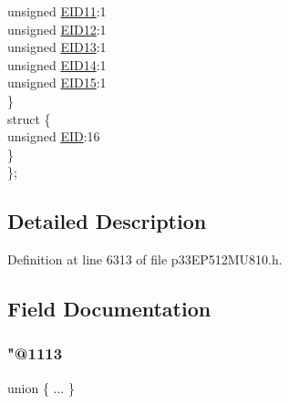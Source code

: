 \begin{DoxyCompactItemize}
\begin{tabbing}
\>\>unsigned \hyperlink{structtag_c2_r_x_f2_e_i_d_b_i_t_s_a710bdb0d602deb021b0be99066008018}{EID11}:1\\
\>\>unsigned \hyperlink{structtag_c2_r_x_f2_e_i_d_b_i_t_s_aa347bb85867bd8d4e0124f7cff8c6472}{EID12}:1\\
\>\>unsigned \hyperlink{structtag_c2_r_x_f2_e_i_d_b_i_t_s_a37d5f3edcbf6ef62f848fd4f3c584f79}{EID13}:1\\
\>\>unsigned \hyperlink{structtag_c2_r_x_f2_e_i_d_b_i_t_s_a7ffc0b0e0d99b8476b6f9a45337c17ab}{EID14}:1\\
\>\>unsigned \hyperlink{structtag_c2_r_x_f2_e_i_d_b_i_t_s_a293cd7dc1746257fa75a60cbd9383cd7}{EID15}:1\\
\>\} \\
\>struct \{\\
\>\>unsigned \hyperlink{structtag_c2_r_x_f2_e_i_d_b_i_t_s_ae80b378c9141f7c03e0b4e55b5f4b54d}{EID}:16\\
\>\} \\
\}; \\

\end{tabbing}\end{DoxyCompactItemize}


\subsection{Detailed Description}


Definition at line 6313 of file p33\+E\+P512\+M\+U810.\+h.



\subsection{Field Documentation}
\mbox{\label{structtag_c2_r_x_f2_e_i_d_b_i_t_s_a1bf001a68d7e9252487ced217229a81c}} 
\subsubsection{\texorpdfstring{"@1113}{@1113}}
{\footnotesize\ttfamily union \{ ... \} }

\mbox{\label{structtag_c2_r_x_f2_e_i_d_b_i_t_s_ae80b378c9141f7c03e0b4e55b5f4b54d}} 
